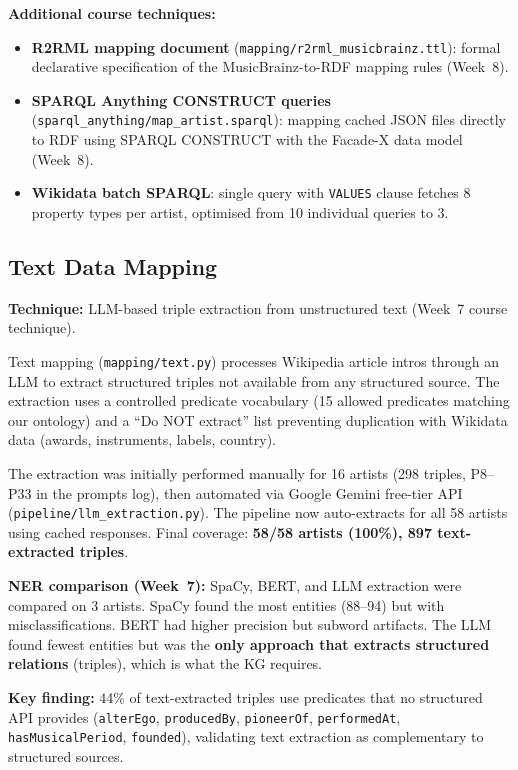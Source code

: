 \documentclass[11pt,a4paper]{article}
\begin{document}
\textbf{Additional course techniques:}
\begin{itemize}[nosep]
  \item \textbf{R2RML mapping document} (\texttt{mapping/r2rml\_musicbrainz.ttl}): formal declarative specification of the MusicBrainz-to-RDF mapping rules (Week~8).
  \item \textbf{SPARQL Anything CONSTRUCT queries} (\texttt{sparql\_anything/map\_artist.sparql}): mapping cached JSON files directly to RDF using SPARQL CONSTRUCT with the Facade-X data model (Week~8).
  \item \textbf{Wikidata batch SPARQL}: single query with \texttt{VALUES} clause fetches 8 property types per artist, optimised from 10 individual queries to 3.
\end{itemize}

\subsection{Text Data Mapping}

\textbf{Technique:} LLM-based triple extraction from unstructured text (Week~7 course technique).

Text mapping (\texttt{mapping/text.py}) processes Wikipedia article intros through an LLM to extract structured triples not available from any structured source. The extraction uses a controlled predicate vocabulary (15 allowed predicates matching our ontology) and a ``Do NOT extract'' list preventing duplication with Wikidata data (awards, instruments, labels, country).

The extraction was initially performed manually for 16 artists (298 triples, P8--P33 in the prompts log), then automated via Google Gemini free-tier API (\texttt{pipeline/llm\_extraction.py}). The pipeline now auto-extracts for all 58 artists using cached responses. Final coverage: \textbf{58/58 artists (100\%), 897 text-extracted triples}.

\textbf{NER comparison (Week~7):} SpaCy, BERT, and LLM extraction were compared on 3 artists. SpaCy found the most entities (88--94) but with misclassifications. BERT had higher precision but subword artifacts. The LLM found fewest entities but was the \textbf{only approach that extracts structured relations} (triples), which is what the KG requires.

\textbf{Key finding:} 44\% of text-extracted triples use predicates that no structured API provides (\texttt{alterEgo}, \texttt{producedBy}, \texttt{pioneerOf}, \texttt{performedAt}, \texttt{hasMusicalPeriod}, \texttt{founded}), validating text extraction as complementary to structured sources.
\end{document}
